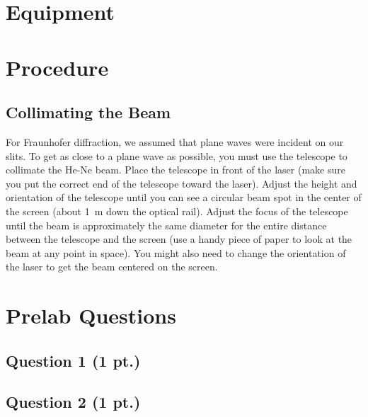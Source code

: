\documentclass[]{manual}
\begin{document}
    \section*{Equipment}


    \newpage

    \section*{Procedure}
    
    \subsection{Collimating the Beam}
    For Fraunhofer diffraction, we assumed that plane waves were incident on our slits.
    To get as close to a plane wave as possible, you must use the telescope to collimate the He-Ne beam.
    Place the telescope in front of the laser (make sure you put the correct end of the telescope toward the laser).
    Adjust the height and orientation of the telescope until you can see a circular beam spot in the center of the screen (about \SI{1}{\meter} down the optical rail).
    Adjust the focus of the telescope until the beam is approximately the same diameter for the entire distance between the telescope and the screen (use a handy piece of paper to look at the beam at any point in space).
    You might also need to change the orientation of the laser to get the beam centered on the screen.
    


    \newpage
    \section*{Prelab Questions}
    \setcounter{subsection}{0}

    \subsection{Question 1 \hfill (1 pt.)}


    \subsection{Question 2 \hfill (1 pt.)}

\end{document}
